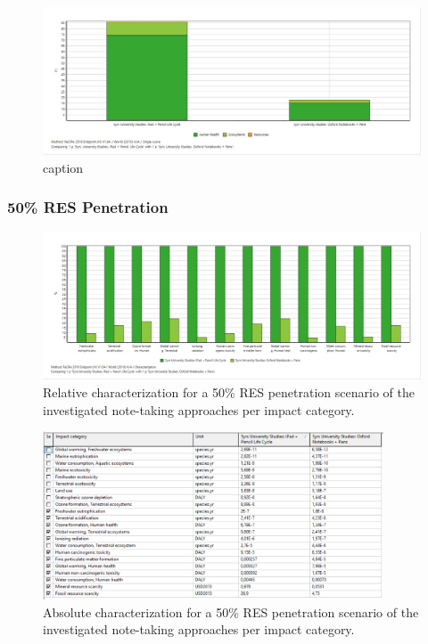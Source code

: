 \begin{figure}[H]
    \centering
    \includegraphics[width=\textwidth]{images/RES_0/Single_Score_RES_0.JPG}
    \caption{caption}\label{fig:single_score_RES0}
\end{figure}

\subsubsection{50\% RES Penetration}

\begin{figure}[H]
    \centering
    \includegraphics[width=\textwidth]{images/RES_50/Characterization_RES_50.JPG}
    \caption{Relative characterization for a 50\% RES penetration scenario of the investigated note-taking approaches per impact category.}\label{fig:characterization_RES_50}
\end{figure}

\begin{figure}[H]
    \centering
    \includegraphics[width=0.9\textwidth]{images/RES_50/Characterization_Table_RES_50.PNG}
    \caption{Absolute characterization for a 50\% RES penetration scenario of the investigated note-taking approaches per impact category.}\label{fig:characterization_table_RES_50}
\end{figure}

